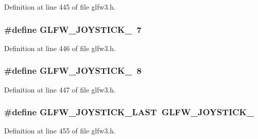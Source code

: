 Definition at line 445 of file glfw3.\-h.

\hypertarget{group__joysticks_ga21a934c940bcf25db0e4c8fe9b364bdb}{
\subsubsection[{G\-L\-F\-W\-\_\-\-J\-O\-Y\-S\-T\-I\-C\-K\-\_\-8}]{\setlength{\rightskip}{0pt plus 5cm}\#define G\-L\-F\-W\-\_\-\-J\-O\-Y\-S\-T\-I\-C\-K\-\_~7}}\label{group__joysticks_ga21a934c940bcf25db0e4c8fe9b364bdb}


Definition at line 446 of file glfw3.\-h.

\hypertarget{group__joysticks_ga87689d47df0ba6f9f5fcbbcaf7b3cecf}{
\subsubsection[{G\-L\-F\-W\-\_\-\-J\-O\-Y\-S\-T\-I\-C\-K\-\_\-9}]{\setlength{\rightskip}{0pt plus 5cm}\#define G\-L\-F\-W\-\_\-\-J\-O\-Y\-S\-T\-I\-C\-K\-\_~8}}\label{group__joysticks_ga87689d47df0ba6f9f5fcbbcaf7b3cecf}


Definition at line 447 of file glfw3.\-h.

\hypertarget{group__joysticks_ga9ca13ebf24c331dd98df17d84a4b72c9}{
\subsubsection[{G\-L\-F\-W\-\_\-\-J\-O\-Y\-S\-T\-I\-C\-K\-\_\-\-L\-A\-S\-T}]{\setlength{\rightskip}{0pt plus 5cm}\#define G\-L\-F\-W\-\_\-\-J\-O\-Y\-S\-T\-I\-C\-K\-\_\-\-L\-A\-S\-T~{\bf G\-L\-F\-W\-\_\-\-J\-O\-Y\-S\-T\-I\-C\-K\-\_}}}\label{group__joysticks_ga9ca13ebf24c331dd98df17d84a4b72c9}


Definition at line 455 of file glfw3.\-h.

